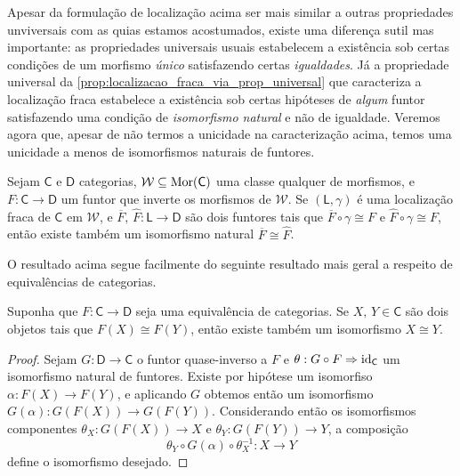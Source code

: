 Apesar da formulação de localização acima ser mais similar a outras propriedades unviversais com as quias estamos acostumados, existe uma diferença sutil mas importante: as propriedades universais usuais estabelecem a existência sob certas condições de um morfismo \emph{único} satisfazendo certas \emph{igualdades}.
Já a propriedade universal da \cref{prop:localizacao_fraca_via_prop_universal} que caracteriza a localização fraca estabelece a existência sob certas hipóteses de \emph{algum} funtor satisfazendo uma condição de \emph{isomorfismo natural} e não de igualdade.
Veremos agora que, apesar de não termos a unicidade na caracterização acima, temos uma unicidade a menos de isomorfismos naturais de funtores.

\begin{prop}\label{prop:unicidade_fraca_funtor_induzido_localizacao_fraca}
  Sejam $\mathsf{C}$ e $\mathsf{D}$ categorias, $\mathcal{W} \subseteq \mathrm{Mor}(\mathsf{C})$ uma classe qualquer de morfismos, e $F: \mathsf{C} \to \mathsf{D}$ um funtor que inverte os morfismos de $\mathcal{W}$.
  Se $(\mathsf{L},\gamma)$ é uma localização fraca de $\mathsf{C}$ em $\mathcal{W}$, e $\overline{F},\,\widehat{F}: \mathsf{L} \to \mathsf{D}$ são dois funtores tais que $\overline{F} \circ \gamma \cong F$ e $\widehat{F} \circ \gamma \cong F$, então existe também um isomorfismo natural $\overline{F} \cong \widehat{F}$.
\end{prop}

O resultado acima segue facilmente do seguinte resultado mais geral a respeito de equivalências de categorias.

\begin{lema}\label{lema:equiv_categorias_quase_injetivo}
  Suponha que $F: \mathsf{C} \to \mathsf{D}$ seja uma equivalência de categorias.
  Se $X,\, Y \in \mathsf{C}$ são dois objetos tais que $F(X) \cong F(Y)$, então existe também um isomorfismo $X \cong Y$.
\end{lema}

\begin{proof}
   Sejam $G: \mathsf{D} \to \mathsf{C}$ o funtor quase-inverso a $F$ e $\theta: G \circ F \Rightarrow \mathrm{id}_{\mathsf{C}}$ um isomorfismo natural de funtores.
  Existe por hipótese um isomorfiso $\alpha: F(X) \to F(Y)$, e aplicando $G$ obtemos então um isomorfismo $G(\alpha): G(F(X)) \to G(F(Y))$.
  Considerando então os isomorfismos componentes $\theta_{X}: G(F(X)) \to X$ e $\theta_{Y}: G(F(Y)) \to Y$, a composição
  \begin{displaymath}
    \theta_{Y} \circ G(\alpha) \circ \theta_{X}^{-1}: X \to Y
  \end{displaymath}
  define o isomorfismo desejado.
\end{proof}

